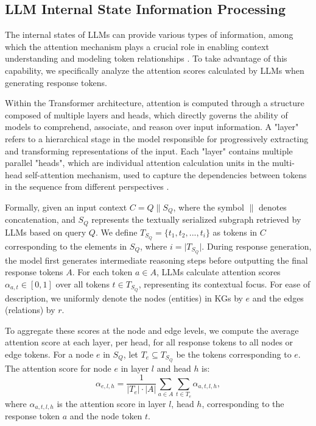 \documentclass[11pt]{article}
\begin{document}
\subsection{LLM Internal State Information Processing}


The internal states of LLMs can provide various types of information, among which the attention mechanism plays a crucial role in enabling context understanding and modeling token relationships \cite{vaswani2017attention}. To take advantage of this capability, we specifically analyze the attention scores calculated by LLMs when generating response tokens.

Within the Transformer architecture, attention is computed through a structure composed of multiple layers and heads, which directly governs the ability of models to comprehend, associate, and reason over input information. A "layer" refers to a hierarchical stage in the model responsible for progressively extracting and transforming representations of the input. Each "layer" contains multiple parallel "heads", which are individual attention calculation units in the multi-head self-attention mechanism, used to capture the dependencies between tokens in the sequence from different perspectives \cite{clark2019does}.


Formally, given an input context $C = Q \parallel S_Q$, where the symbol $\parallel$ denotes concatenation, and $S_Q$ represents the textually serialized subgraph retrieved by LLMs based on query $Q$. We define $T_{S_Q} = \{t_1, t_2, ..., t_i\}$ as tokens in $C$ corresponding to the elements in $S_Q$, where $i = \lvert T_{S_Q} \lvert$. During response generation, the model first generates intermediate reasoning steps before outputting the final response tokens $A$. For each token $a \in A$, LLMs calculate attention scores $\alpha_{a,t} \in [0,1]$ over all tokens $t \in T_{S_Q}$, representing its contextual focus. For ease of description, we uniformly denote the nodes (entities) in KGs by $e$ and the edges (relations) by $r$.

To aggregate these scores at the node and edge levels, we compute the average attention score at each layer, per head, for all response tokens to all nodes or edge tokens. For a node $e$ in $S_Q$, let $T_e \subseteq T_{S_Q}$ be the tokens corresponding to $e$. The attention score for node $e$ in layer $l$ and head $h$ is:
\begin{equation}
    \alpha_{e,l,h} = \frac{1}{|T_e| \cdot |A|} \sum_{a \in A} \sum_{t \in T_e} \alpha_{a,t,l,h},
\end{equation}
where $\alpha_{a,t,l,h}$ is the attention score in layer $l$, head $h$, corresponding to the response token $a$ and the node token $t$.
\end{document}
